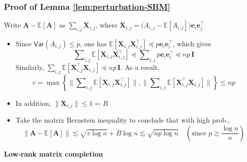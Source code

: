 \documentclass[compress,
mathserif,wide,%
]{beamer}
\begin{document}
\begin{frame}
\frametitle{Proof of Lemma \ref{lem:perturbation-SBM}}

{\small
Write $\bm{A}-\mathbb{E}[\bm{A}]$ as $\sum_{i,j}\bm{X}_{i,j}$, where
$\bm{X}_{i,j}=\big(A_{i,j}-\mathbb{E}[A_{i,j}]\big)\bm{e}_{i}\bm{e}_{j}^{\top}$
%
\begin{itemize}
\itemsep0.5em
\item Since $\mathsf{Var}(A_{i,j})\leq p$, one has
$\mathbb{E}\left[\bm{X}_{i,j}\bm{X}_{i,j}^{\top}\right]\preceq p\bm{e}_{i}\bm{e}_{i}^{\top}$, which gives
%
\[
\sum\nolimits_{i,j}\mathbb{E}\left[\bm{X}_{i,j}\bm{X}_{i,j}^{\top}\right]\preceq\sum\nolimits_{i,j}p \bm{e}_{i}\bm{e}_{i}^{\top} \preceq np\,\bm{I}
\]
%
Similarly, $\sum_{i,j}\mathbb{E}\left[ \bm{X}_{i,j}^{\top} \bm{X}_{i,j} \right]\preceq np\,\bm{I}$.
As a result,
%
\[
v=\max\left\{ \Big\|\sum\nolimits_{i,j}\mathbb{E}\left[\bm{X}_{i,j}\bm{X}_{i,j}^{\top}\right]\Big\|,\Big\|\sum\nolimits_{i,j}\mathbb{E}\left[\bm{X}_{i,j}^{\top}\bm{X}_{i,j}\right]\Big\|\right\} \leq np
\]
%
\item In addition, $\|\bm{X}_{i,j}\|\leq1 \eqqcolon B$
	
\item Take the matrix Bernstein inequality to conclude that with high prob.,
%
\begin{equation*}
	\|\bm{A}-\mathbb{E}[\bm{A}]\|\lesssim\sqrt{v\log n}+B\log n\lesssim \sqrt{np\log n} \quad(\text{since }p\gtrsim \frac{\log n}{n})
\end{equation*}
%
\end{itemize}
%
%

}


\end{frame}





\begin{frame}[plain]
	\vfill
	\centering
	\large \bf Low-rank matrix completion
	\vfill
\end{frame}
\end{document}
